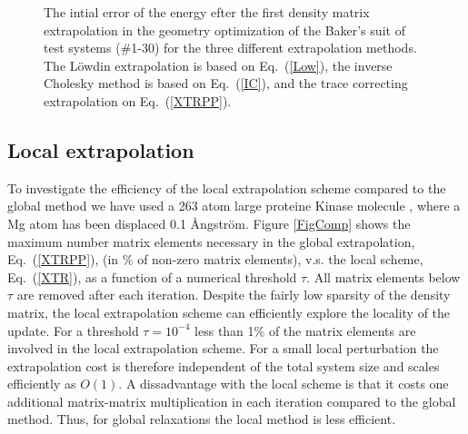 \documentclass[twocolumn,showpacs,preprintnumbers,amsmath,amssymb]{revtex4}
\begin{document}
\begin{figure}[t]
\caption{\label{FigError}
The intial error of the energy efter the first density matrix extrapolation 
in the geometry optimization of the Baker's suit of test systems (\#1-30) \cite{Baker93,Nemeth04}
for the three different extrapolation methods.
The L\"{o}wdin extrapolation is based on Eq.\ (\ref{Low}), the inverse Cholesky
method is based on Eq.\ (\ref{IC}), and the trace correcting extrapolation on Eq.\ (\ref{XTRPP}).}
\end{figure}

\subsection{Local extrapolation}\label{LOC}

To investigate the efficiency of the local extrapolation scheme compared to the global 
method we have used a 263 atom large proteine Kinase molecule \cite{Nemeth04}, where a Mg atom
has been displaced 0.1 {\AA}ngstr\"{o}m. 
Figure \ref{FigComp} shows the maximum number matrix elements necessary in the global 
extrapolation,  Eq.\ (\ref{XTRPP}), (in \% of non-zero matrix elements),
v.s. the local scheme, Eq.\ (\ref{XTR}), as a function of a numerical threshold $\tau$.
All matrix elements below $\tau$ are removed after each iteration.
Despite the fairly low sparsity of the density matrix, the local extrapolation scheme can efficiently
explore the locality of the update. For a threshold $\tau = 10^{-4}$ less than 1\% of
the matrix elements are involved in the local extrapolation scheme. For a small
local perturbation the extrapolation cost is therefore independent of the total
system size and scales efficiently as $O(1)$. A dissadvantage
with the local scheme is that it costs one additional matrix-matrix multiplication 
in each iteration compared to the global method. Thus, for global relaxations 
the local method is less efficient.
\end{document}
